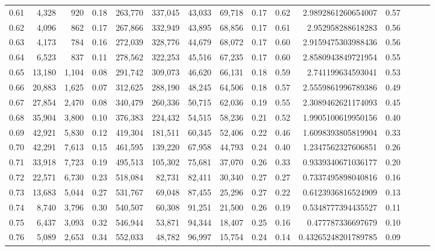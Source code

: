 \begin{tabular}{rrrrrrrrrrrrrrr}
0.61 &   4,328 &    920 &  0.18 &  263,770 &  337,045 &   43,033 &   69,718 &  0.17 &  0.62 &    2.9892861260654007 &      0.57 \\
0.62 &   4,096 &    862 &  0.17 &  267,866 &  332,949 &   43,895 &   68,856 &  0.17 &  0.61 &     2.952958288618283 &      0.56 \\
0.63 &   4,173 &    784 &  0.16 &  272,039 &  328,776 &   44,679 &   68,072 &  0.17 &  0.60 &    2.9159475303988436 &      0.56 \\
0.64 &   6,523 &    837 &  0.11 &  278,562 &  322,253 &   45,516 &   67,235 &  0.17 &  0.60 &    2.8580943849721954 &      0.55 \\
0.65 &  13,180 &  1,104 &  0.08 &  291,742 &  309,073 &   46,620 &   66,131 &  0.18 &  0.59 &     2.741199634593041 &      0.53 \\
0.66 &  20,883 &  1,625 &  0.07 &  312,625 &  288,190 &   48,245 &   64,506 &  0.18 &  0.57 &    2.5559861996789386 &      0.49 \\
0.67 &  27,854 &  2,470 &  0.08 &  340,479 &  260,336 &   50,715 &   62,036 &  0.19 &  0.55 &    2.3089462621174093 &      0.45 \\
0.68 &  35,904 &  3,800 &  0.10 &  376,383 &  224,432 &   54,515 &   58,236 &  0.21 &  0.52 &    1.9905100619950156 &      0.40 \\
0.69 &  42,921 &  5,830 &  0.12 &  419,304 &  181,511 &   60,345 &   52,406 &  0.22 &  0.46 &    1.6098393805819904 &      0.33 \\
0.70 &  42,291 &  7,613 &  0.15 &  461,595 &  139,220 &   67,958 &   44,793 &  0.24 &  0.40 &    1.2347562327606851 &      0.26 \\
0.71 &  33,918 &  7,723 &  0.19 &  495,513 &  105,302 &   75,681 &   37,070 &  0.26 &  0.33 &    0.9339340671036177 &      0.20 \\
0.72 &  22,571 &  6,730 &  0.23 &  518,084 &   82,731 &   82,411 &   30,340 &  0.27 &  0.27 &    0.7337495898040816 &      0.16 \\
0.73 &  13,683 &  5,044 &  0.27 &  531,767 &   69,048 &   87,455 &   25,296 &  0.27 &  0.22 &    0.6123936816524909 &      0.13 \\
0.74 &   8,740 &  3,796 &  0.30 &  540,507 &   60,308 &   91,251 &   21,500 &  0.26 &  0.19 &    0.5348777394435527 &      0.11 \\
0.75 &   6,437 &  3,093 &  0.32 &  546,944 &   53,871 &   94,344 &   18,407 &  0.25 &  0.16 &     0.477787336697679 &      0.10 \\
0.76 &   5,089 &  2,653 &  0.34 &  552,033 &   48,782 &   96,997 &   15,754 &  0.24 &  0.14 &   0.43265248201789785 &      0.09 \\

\end{tabular}
